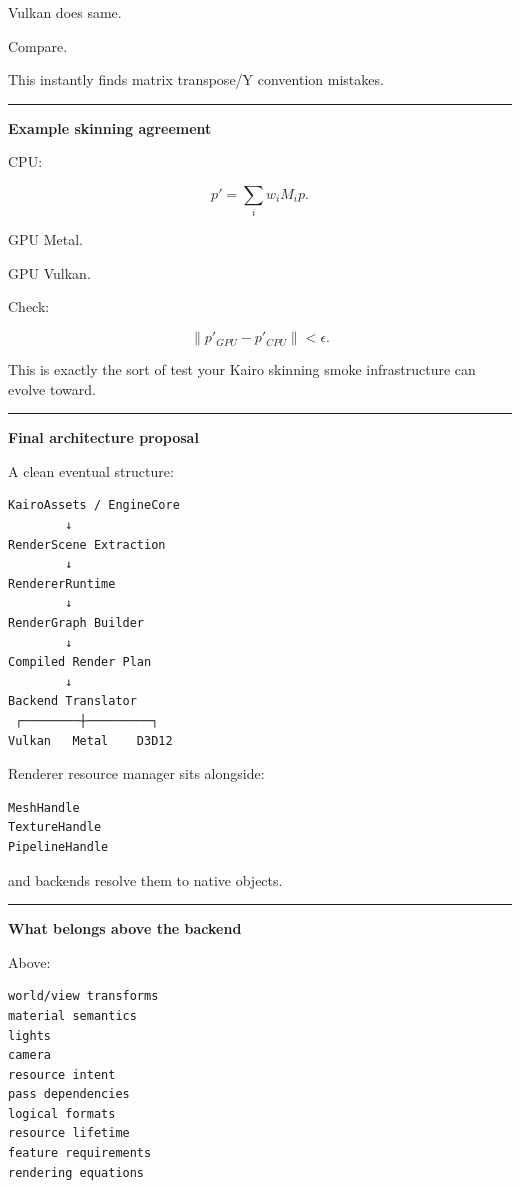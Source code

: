 Vulkan does same.

Compare.

This instantly finds matrix transpose/Y convention mistakes.

\begin{center}\rule{0.5\linewidth}{0.5pt}\end{center}

\textbf{Example skinning agreement}

CPU:

\[
p'=
\sum_i
w_i
M_i p.
\]

GPU Metal.

GPU Vulkan.

Check:

\[
\|p'_{GPU}-p'_{CPU}\|
<
\epsilon.
\]

This is exactly the sort of test your Kairo skinning smoke infrastructure can evolve toward.

\begin{center}\rule{0.5\linewidth}{0.5pt}\end{center}

\textbf{Final architecture proposal}

A clean eventual structure:

\begin{verbatim}
KairoAssets / EngineCore
        ↓
RenderScene Extraction
        ↓
RendererRuntime
        ↓
RenderGraph Builder
        ↓
Compiled Render Plan
        ↓
Backend Translator
 ┌────────┼─────────┐
Vulkan   Metal    D3D12
\end{verbatim}

Renderer resource manager sits alongside:

\begin{verbatim}
MeshHandle
TextureHandle
PipelineHandle
\end{verbatim}

and backends resolve them to native objects.

\begin{center}\rule{0.5\linewidth}{0.5pt}\end{center}

\textbf{What belongs above the backend}

Above:

\begin{verbatim}
world/view transforms
material semantics
lights
camera
resource intent
pass dependencies
logical formats
resource lifetime
feature requirements
rendering equations
\end{verbatim}

